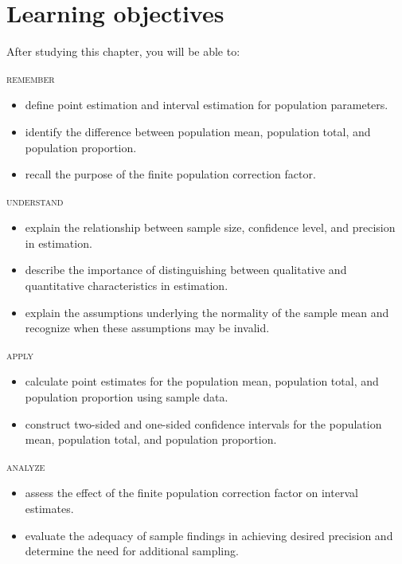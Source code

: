 \newpage

\section*{Learning objectives}
After studying this chapter, you will be able to:

\bigskip
\noindent \textsc{remember}

\begin{itemize}

\item define point estimation and interval estimation for population parameters.
\item identify the difference between population mean, population total, and population proportion.
\item recall the purpose of the finite population correction factor.
\end{itemize}

\noindent \textsc{understand}
\begin{itemize}

\item explain the relationship between sample size, confidence level, and precision in estimation.
\item describe the importance of distinguishing between qualitative and quantitative characteristics in estimation.
\item explain the assumptions underlying the normality of the sample mean and recognize when these assumptions may be invalid.
\end{itemize}

\noindent \textsc{apply}
\begin{itemize}

\item calculate point estimates for the population mean, population total, and population proportion using sample data.
\item construct two-sided and one-sided confidence intervals for the population mean, population total, and population proportion.
\end{itemize}

\noindent \textsc{analyze}
\begin{itemize}

\item assess the effect of the finite population correction factor on interval estimates.
\item evaluate the adequacy of sample findings in achieving desired precision and determine the need for additional sampling.
\end{itemize}

